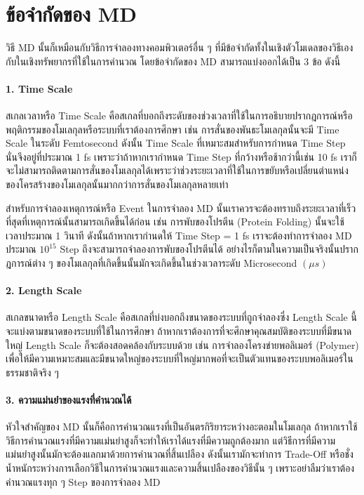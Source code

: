 \section{ข้อจำกัดของ MD}

วิธี MD นั้นก็เหมือนกับวิธีการจำลองทางคอมพิวเตอร์อื่น ๆ ที่มีข้อจำกัดทั้งในเชิงตัวโมเดลของวิธีเองกับในเชิงทรัพยากรที่ใช้ในการคำนวณ โดยข้อจำกัดของ MD สามารถแบ่งออกได้เป็น 3 ข้อ ดังนี้

\paragraph{1. Time Scale} สเกลเวลาหรือ Time Scale คือสเกลที่บอกถึงระดับของช่วงเวลาที่ใช้ในการอธิบายปรากฎการณ์หรือพฤติกรรมของโมเลกุลหรือระบบที่เราต้องการศึกษา เช่น การสั่นของพันธะโมเลกุลนั้นจะมี Time Scale ในระดับ Femtosecond ดังนั้น Time Scale ที่เหมาะสมสำหรับการกำหนด Time Step นั่นจึงอยู่ที่ประมาณ 1 fs เพราะว่าถ้าหากเรากำหนด Time Step ที่กว้างหรือช้ากว่านี้เช่น 10 fs เราก็จะไม่สามารถติดตามการสั่นของโมเลกุลได้เพราะว่าช่วงระยะเวลาที่ใช้ในการขยับหรือเปลี่ยนตำแหน่งของโครสร้างของโมเลกุลนั้นมากกว่าการสั่นของโมเลกุลหลายเท่า

สำหรับการจำลองเหตุการณ์หรือ Event ในการจำลอง MD นั้นเราควรจะต้องทราบถึงระยะเวลาที่เร็วที่สุดที่เหตุการณ์นั้นสามารถเกิดขึ้นได้ก่อน เช่น การพับของโปรตีน (Protein Folding) นั้นจะใช้เวลาประมาณ 1 วินาที ดังนั้นถ้าหากเรากำนดให้ Time Step = 1 fs เราจะต้องทำการจำลอง MD ประมาณ $10^{15}$ Step ถึงจะสามารถจำลองการพับของโปรตีนได้ อย่างไรก็ตามในความเป็นจริงนั้นปรากฎการณ์ต่าง ๆ ของโมเลกุลที่เกิดขึ้นนั้นมักจะเกิดขึ้นในช่วงเวลาระดับ Microsecond $(\mu s)$

\paragraph{2. Length Scale} สเกลขนาดหรือ Length Scale คือสเกลที่บ่งบอกถึงขนาดของระบบที่ถูกจำลองซึ่ง Length Scale นี้จะแบ่งตามขนาดของระบบที่ใช้ในการศึกษา ถ้าหากเราต้องการที่จะศึกษาคุณสมบัติของระบบที่มีขนาดใหญ่ Length Scale ก็จะต้องสอดคล้องกับระบบด้วย เช่น การจำลองโครงข่ายพอลิเมอร์ (Polymer) เพื่อให้มีความเหมาะสมและมีขนาดใหญ่ของระบบที่ใหญ่มากพอที่จะเป็นตัวแทนของระบบพอลิเมอร์ในธรรมชาติจริง ๆ

\paragraph{3. ความแม่นยำของแรงที่คำนวณได้} หัวใจสำคัญของ MD นั้นก็คือการคำนวณแรงที่เป็นอันตรกิริยาระหว่างอะตอมในโมเลกุล ถ้าหากเราใช้วิธีการคำนวณแรงที่มีความแม่นยำสูงก็จะทำให้เราได้แรงที่มีความถูกต้องมาก แต่วิธีการที่มีความแม่นยำสูงนั้นมักจะต้องแลกมาด้วยการคำนวณที่สิ้นเปลือง ดังนั้นเรามักจะทำการ Trade-Off หรือชั่งน้ำหนักระหว่างการเลือกวิธีในการคำนวณแรงและความสิ้นเปลืองของวิธีนั้น ๆ เพราะอย่าลืมว่าเราต้องคำนวณแรงทุก ๆ Step ของการจำลอง MD

